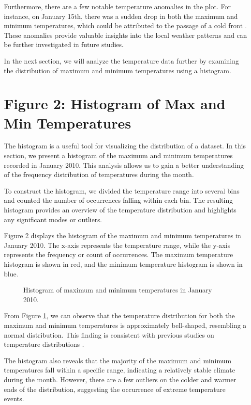 \documentclass{article}
\begin{document}
{Furthermore, there are a few notable temperature anomalies in the plot. For instance, on January 15th, there was a sudden drop in both the maximum and minimum temperatures, which could be attributed to the passage of a cold front \cite{cold_front}. These anomalies provide valuable insights into the local weather patterns and can be further investigated in future studies.

In the next section, we will analyze the temperature data further by examining the distribution of maximum and minimum temperatures using a histogram.

\section{Figure 2: Histogram of Max and Min Temperatures}
\label{sec:histogram}

The histogram is a useful tool for visualizing the distribution of a dataset. In this section, we present a histogram of the maximum and minimum temperatures recorded in January 2010. This analysis allows us to gain a better understanding of the frequency distribution of temperatures during the month.

To construct the histogram, we divided the temperature range into several bins and counted the number of occurrences falling within each bin. The resulting histogram provides an overview of the temperature distribution and highlights any significant modes or outliers.

Figure 2 displays the histogram of the maximum and minimum temperatures in January 2010. The x-axis represents the temperature range, while the y-axis represents the frequency or count of occurrences. The maximum temperature histogram is shown in red, and the minimum temperature histogram is shown in blue.

\begin{figure}[h]
  \centering
  \caption{Histogram of maximum and minimum temperatures in January 2010.}
  \label{fig:temp_histogram}
\end{figure}

From Figure \ref{fig:temp_histogram}, we can observe that the temperature distribution for both the maximum and minimum temperatures is approximately bell-shaped, resembling a normal distribution. This finding is consistent with previous studies on temperature distributions \cite{temperature_distribution}.

The histogram also reveals that the majority of the maximum and minimum temperatures fall within a specific range, indicating a relatively stable climate during the month. However, there are a few outliers on the colder and warmer ends of the distribution, suggesting the occurrence of extreme temperature events.

}
\end{document}
